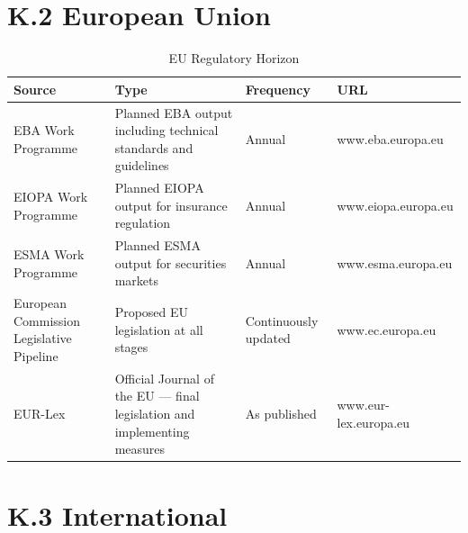 \section*{K.2 European Union}

\begin{table}[H]
  \centering
  \renewcommand{\arraystretch}{1.5}
  \begin{tabularx}{\textwidth}{ | >{\raggedright\arraybackslash}p{} 
								| >{\raggedright\arraybackslash}p{} 
								| >{\raggedright\arraybackslash}p{} 
                                | >{\raggedright\arraybackslash}X | }
    \hline
    \textbf{Source} & \textbf{Type} & \textbf{Frequency} & \textbf{URL}  \\
    \hline
    EBA Work Programme & Planned EBA output including technical standards and guidelines & Annual & www.eba.europa.eu\\
    \hline
    EIOPA Work Programme & Planned EIOPA output for insurance regulation & Annual & www.eiopa.europa.eu\\
    \hline
    ESMA Work Programme & Planned ESMA output for securities markets & Annual & www.esma.europa.eu\\
    \hline
    European Commission Legislative Pipeline & Proposed EU legislation at all stages & Continuously updated & www.ec.europa.eu\\
    \hline
    EUR-Lex & Official Journal of the EU — final legislation and implementing measures & As published & www.eur-lex.europa.eu\\
    \hline
  \end{tabularx}
  \caption{EU Regulatory Horizon}
\end{table}

\section*{K.3 International}

